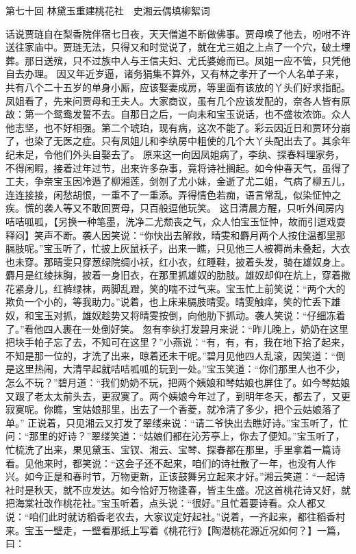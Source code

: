 \documentclass[12pt,oneside]{book}
\begin{document}
 
第七十回  林黛玉重建桃花社　史湘云偶填柳絮词


话说贾琏自在梨香院伴宿七日夜，天天僧道不断做佛事。贾母唤了他去，吩咐不许送往家庙中。贾琏无法，只得又和时觉说了，就在尤三姐之上点了一个穴，破土埋葬。那日送殡，只不过族中人与王信夫妇、尤氏婆媳而已。凤姐一应不管，只凭他自去办理。
因又年近岁逼，诸务狷集不算外，又有林之孝开了一个人名单子来，共有八个二十五岁的单身小厮，应该娶妻成房，等里面有该放的丫头们好求指配。凤姐看了，先来问贾母和王夫人。大家商议，虽有几个应该发配的，奈各人皆有原故：第一个鸳鸯发誓不去。自那日之后，一向未和宝玉说话，也不盛妆浓饰。众人他志坚，也不好相强。第二个琥珀，现有病，这次不能了。彩云因近日和贾环分崩了，也染了无医之症。只有凤姐儿和李纨房中粗使的几个大丫头配出去了。其余年纪未足，令他们外头自娶去了。
原来这一向因凤姐病了，李纨、探春料理家务，不得闲暇，接着过年过节，出来许多杂事，竟将诗社搁起。如今仲春天气，虽得了工夫，争奈宝玉因冷遁了柳湘莲，剑刎了尤小妹，金逝了尤二姐，气病了柳五儿，连连接接，闲愁胡恨，一重不了一重添。弄得情色若痴，语言常乱，似染怔忡之疾。慌的袭人等又不敢回贾母，只百般逗他玩笑。
这日清晨方醒，只听外间房内咭咭呱呱，【另换一种笔墨，洗净二尤颓丧之气，众人怕宝玉怔忡，故而引逗戏耍释闷】笑声不断。袭人因笑说：“你快出去解救，晴雯和麝月两个人按住温都里那膈肢呢。”宝玉听了，忙披上灰鼠袄子，出来一瞧，只见他三人被褥尚未叠起，大衣也未穿。那晴雯只穿葱绿院绸小袄，红小衣，红睡鞋，披着头发，骑在雄奴身上。麝月是红绫抹胸，披着一身旧衣，在那里抓雄奴的肋肢。雄奴却仰在炕上，穿着撒花紧身儿，红裤绿袜，两脚乱蹬，笑的喘不过气来。宝玉忙上前笑说：“两个大的欺负一个小的，等我助力。”说着，也上床来膈肢晴雯。晴雯触痒，笑的忙丢下雄奴，和宝玉对抓，雄奴趁势又将晴雯按倒，向他肋下抓动。袭人笑说：“仔细冻着了。”看他四人裹在一处倒好笑。
忽有李纨打发碧月来说：“昨儿晚上，奶奶在这里把块手帕子忘了去，不知可在这里？”小燕说：“有，有，有，我在地下拾了起来，不知是那一位的，才洗了出来，晾着还未干呢。”碧月见他四人乱滚，因笑道：“倒是这里热闹，大清早起就咭咭呱呱的玩到一处。”宝玉笑道：“你们那里人也不少，怎么不玩？”碧月道：“我们奶奶不玩，把两个姨娘和琴姑娘也屏住了。如今琴姑娘又跟了老太太前头去，更寂寞了。两个姨娘今年过了，到明年冬天，都去了，又更寂寞呢。你瞧，宝姑娘那里，出去了一个香菱，就冷清了多少，把个云姑娘落了单。”
正说着，只见湘云又打发了翠缕来说：“请二爷快出去瞧好诗。”宝玉听了，忙问：“那里的好诗？”翠缕笑道：“姑娘们都在沁芳亭上，你去了便知。”宝玉听了，忙梳洗了出来，果见黛玉、宝钗、湘云、宝琴、探春都在那里，手里拿着一篇诗看。见他来时，都笑说：“这会子还不起来，咱们的诗社散了一年，也没有人作兴。如今正是和春时节，万物更新，正该鼓舞另立起来才好。”湘云笑道：“一起诗社时是秋天，就不应发达。如今恰好万物逢春，皆主生盛。况这首桃花诗又好，就把海棠社改作桃花社。”宝玉听着，点头说：“很好。”且忙着要诗看。众人都又说：“咱们此时就访稻香老农去，大家议定好起社。”说着，一齐起来，都往稻香村来。宝玉一壁走，一壁看那纸上写着《桃花行》【陶潜桃花源近况如何？】一篇，曰：
\end{document}
